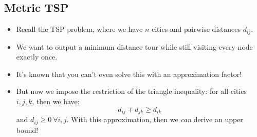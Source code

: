 \begin{itemize}

\end{itemize}

\subsection{Metric TSP}
\begin{itemize}
	\item Recall the TSP problem, where we have \( n \) cities and pairwise distances \( d_{ij} \). 
	\item We want to output a minimum distance tour while still visiting every node exactly once. 
	\item It's known that you can't even solve this with an approximation factor!  
	\item But now we impose the restriction of the triangle inequality: for all cities \( i, j, k \), then 
		we have:
		\[
			d_{ij} + d_{jk} \ge d_{ik}
		\] 
		and \( d_{ij} \ge 0 \ \forall i,j \). With this approximation, then we \textit{can} derive an upper bound!
\end{itemize}
